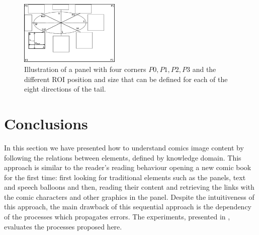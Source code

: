

 \begin{figure}[!ht]
   \centering
  \includegraphics[width=180px]{roi_hypothesis.pdf}
  \caption[Illustration of the character region of interested computation for each of the eight directions of the tail]{Illustration of a panel with four corners $P0, P1, P2, P3$ and the different ROI position and size that can be defined for each of the eight directions of the tail.
  }
  \label{fig:se:roi_area}
 \end{figure}




\section{Conclusions}
\label{sec:se:conclusion}
In this section we have presented how to understand comics image content by following the relations between elements, defined by knowledge domain.
This approach is similar to the reader's reading behaviour opening a new comic book for the first time: first looking for traditional elements such as the panels, text and speech balloons and then, reading their content and retrieving the links with the comic characters and other graphics in the panel.
Despite the intuitiveness of this approach, the main drawback of this sequential approach is the dependency of the processes which propagates errors.
The experiments, presented in , evaluates the processes proposed here.


